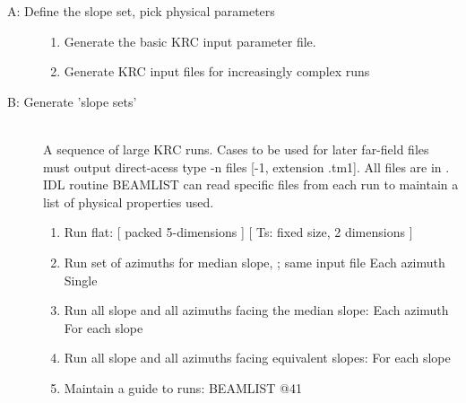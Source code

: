 \documentclass{article}
\begin{document}
\begin{description}  %
\item [A: Define the slope set, pick physical parameters] \hspace{1.mm} 
\begin{enumerate}    %
\item Generate the basic KRC input parameter file.  
\item Generate KRC input files for increasingly complex runs
\end{enumerate}
 
\item [B: Generate 'slope sets'] \hspace{1.mm} \\ A sequence of large KRC
  runs. Cases to be used for later far-field files must output direct-acess type
  -n files [-1, extension .tm1]. All files are in  . 
IDL routine BEAMLIST can read specific files from
  each run to maintain a list of physical properties used.

\begin{enumerate}    %
\item Run flat:   
  \qi {}  [ packed 5-dimensions ]
  \qi {} [ Ts: fixed size, 2 dimensions ] 
\item Run set of azimuths for median slope, ; same input file
 \qi Each azimuth 
   \qi Single  
\item Run all slope and all azimuths facing the median slope:    
\qi  Each azimuth 
 \qi For each slope 
\item Run all slope and all azimuths facing equivalent slopes:   
 \qi For each slope 
\item Maintain a guide to runs: BEAMLIST @41
\end{enumerate}



\end{description}
\end{document}
